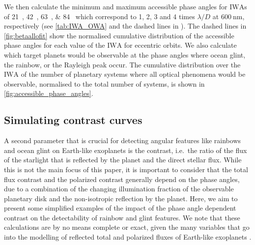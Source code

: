 \documentclass[
    usenatbib,
]{mnras}
\newcommand{\IWA}{\ensuremath{\mathrm{IWA}}}
\begin{document}
We then calculate the minimum and maximum accessible phase 
angles for \IWA{}s of \qtylist{21; 42; 63; 84}{\mas} which correspond to 1, 2, 3 and 4 times $\lambda / D$ at $\qty{600}{\nano\meter}$, respectively (see \cref{tab:IWA_OWA} and the dashed lines in ).
%
The dashed lines in \cref{fig:betaallofit} show the normalised cumulative 
distribution of the accessible phase angles for each value of the 
\IWA{} for eccentric orbits. 
%
We also calculate which target planets would be observable at the phase angles where ocean glint, the rainbow, or the Rayleigh peak occur.
%
The cumulative distribution over the \IWA{} of the number of planetary systems where all optical phenomena would be observable, normalised to the total number of systems, is shown in \cref{fig:accessible_phase_angles}.
%

\subsection{Simulating contrast curves}
\label{subsec:2.4}

A second parameter that is crucial for detecting angular features like 
rainbows and ocean glint on Earth-like exoplanets is the contrast, i.e.\ 
the ratio of the flux of the starlight that is reflected by the planet 
and the direct stellar flux. 
%
While this is not the main focus of this paper, it is important to consider that the total flux contrast and the polarized contrast generally 
depend on the phase angles, due to a combination of the changing illumination fraction of the observable planetary disk and the non-isotropic reflection by the planet.
%
Here, we aim to present some simplified examples of the impact of the 
phase angle dependent contrast on the detectability of rainbow and 
glint features. 
%
We note that these calculations are by no means complete or exact, given 
the many variables that go into the modelling of reflected total and
polarized fluxes of Earth-like exoplanets \citep{ treesandstam2019,trees2022}.
%
\end{document}
